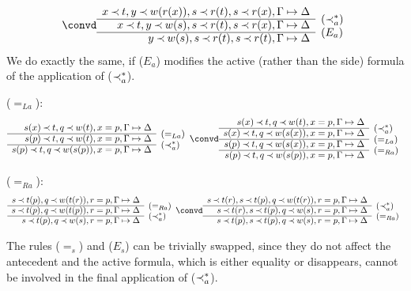 \begin{PROOF}
\begin{LS}
\[	  \convd
 \begin{array}{rl}
x\Incl t, y\Incl w(r(x)), s\Incl r(t), s\Incl r(x),\GSD \\ \cline{1-1}
x\Incl t, y\Incl w(s), s\Incl r(t), s\Incl r(x),\GSD  & \rabove{(\Incl_a^*)} \\ \cline{1-1}
          y\Incl w(s), s\Incl r(t), s\Incl r(t),\GSD  & \rabove{(E_a)} \end{array} \]
%
We do exactly the same, if ($E_a$) modifies the active (rather than the side)
formula of the application of ($\mathbin{\prec}_a^*$).
\item ($=_{La}$):
\[ \begin{array}{rl}
s(x)\Incl t, q\Incl w(t), x=p, \GSD \\ \cline{1-1}
s(p)\Incl t, q\Incl w(t), x=p, \GSD & \rabove{(=_{La})} \\ \cline{1-1}
s(p)\Incl t, q\Incl w(s(p)), x=p, \GSD & \rabove{(\Incl_a^*)} \end{array} \convd
 \begin{array}{rl}
s(x)\Incl t, q\Incl w(t), x=p, \GSD \\ \cline{1-1}
s(x)\Incl t, q\Incl w(s(x)), x=p, \GSD & \rabove{(\Incl_a^*)} \\ \cline{1-1}
s(p)\Incl t, q\Incl w(s(x)), x=p, \GSD & \rabove{(=_{La})} \\ \cline{1-1}
s(p)\Incl t, q\Incl w(s(p)), x=p, \GSD & \rabove{(=_{Ra})} 
\end{array} \]
\item ($=_{Ra}$):
\[ \begin{array}{rl}
s\Incl t(p), q\Incl w(t(r)), r=p, \GSD \\ \cline{1-1}
s\Incl t(p), q\Incl w(t(p)), r=p, \GSD & \rabove{(=_{Ra})}\\ \cline{1-1}
s\Incl t(p), q\Incl w(s), r=p, \GSD & \rabove{(\Incl_a^*)} \end{array} \convd
 \begin{array}{rl}
s\Incl t(r), s\Incl t(p), q\Incl w(t(r)), r=p, \GSD \\ \cline{1-1}
s\Incl t(r), s\Incl t(p), q\Incl w(s), r=p, \GSD & \rabove{(\Incl_a^*)} \\ \cline{1-1}
s\Incl t(p), s\Incl t(p), q\Incl w(s), r=p, \GSD & \rabove{(=_{Ra})} \end{array} \]
%
\item The rules ($=_s$) and ($E_s$) can be trivially swapped, since they do
not affect the antecedent and the active formula, which is either equality or
disappears, cannot be involved in the final application of ($\mathbin{\prec}_a^*$).
\end{LS}
\end{PROOF}
